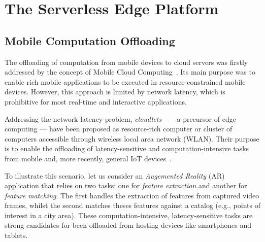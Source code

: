 \section{The Serverless Edge Platform}\label{sec:SEP}

\subsection{Mobile Computation Offloading}\label{sec:SEP_MCO}

The offloading of computation from mobile devices to cloud servers was firstly addressed by the concept of Mobile Cloud Computing~\cite{Khan:14}. Its main purpose was to enable rich mobile applications to be executed in resource-constrained mobile devices. However, this approach is limited by network latency, which is prohibitive for most real-time and interactive applications.

Addressing the network latency problem, \textit{cloudlets}~\cite{Satyanarayanan:2009} --- a precursor of edge computing --- have been proposed as resource-rich computer or cluster of computers  accessible through wireless local area network (WLAN). Their purpose is to enable the offloading of latency-sensitive and computation-intensive tasks from mobile and, more recently, general IoT devices~\cite{Satyanarayanan:2017}.  


To illustrate this scenario, let us consider an \textit{Augemented Reality} (AR) application that relies on two tasks: one for \textit{feature extraction} and another for \textit{feature matching}. The first handles the extraction of features from captured video frames, whilst the second matches theses features against a catalog (e.g., points of interest in a city area). 
These computation-intensive, latency-sensitive tasks are strong candidates for been offloaded from hosting devices like smartphones and tablets.

